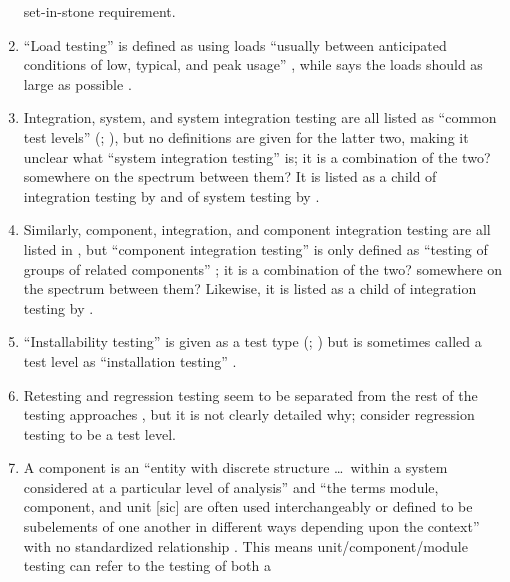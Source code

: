 \begin{enumerate}
            set-in-stone requirement.
      \item ``Load testing'' is defined as using loads ``usually between
            anticipated conditions of low, typical, and peak usage''
            \citep[p.~5]{IEEE2022}, while \citeauthor{Patton2006} says the
            loads should as large as possible \citeyearpar[p.~86]{Patton2006}.
      \item Integration, system, and system integration testing are all listed
            as ``common test levels'' (\citealp[p.~12]{IEEE2022};
            \citeyear[p.~6]{IEEE2021}), but no
            definitions are given for the latter two, making it unclear what
            ``system integration testing'' is; it is a combination of the two?
            somewhere on the spectrum between them? It is listed as a child
            of integration testing by \citetISTQB{} and of system testing
            by \citet[p.~23]{Firesmith2015}.
      \item Similarly, component, integration, and component integration
            testing are all listed in \citep{IEEE2017}, but ``component
            integration testing'' is only defined as ``testing of groups of
            related components'' \citep[p.~82]{IEEE2017}; it is a combination of
            the two? somewhere on the spectrum between them? Likewise, it is
            listed as a child of integration testing by \citetISTQB{}.
      \item ``Installability testing'' is given as a test type
            (\citealp[p.~22]{IEEE2022}; \citeyear[p.~38]{IEEE2021})
            but is sometimes called a test level as
            ``installation testing'' \citep[p.~445]{PetersAndPedrycz2000}.
      \item Retesting and regression testing seem to be separated from the rest
            of the testing approaches \citep[p.~23]{IEEE2022}, but it is not
            clearly detailed why; \citet[p.~3]{BarbosaEtAl2006} consider
            regression testing to be a test level.
      \item A component is an ``entity with discrete structure \dots\ within a
            system considered at a particular level of analysis''
            \citep{ISO_IEC2023b} and ``the terms module, component, and unit
                  [sic] are often used interchangeably or defined to be subelements
            of one another in different ways depending upon the context'' with
            no standardized relationship \citep[p.~82]{IEEE2017}. This means
            unit/component/module testing can refer to the testing of both a

\end{enumerate}
